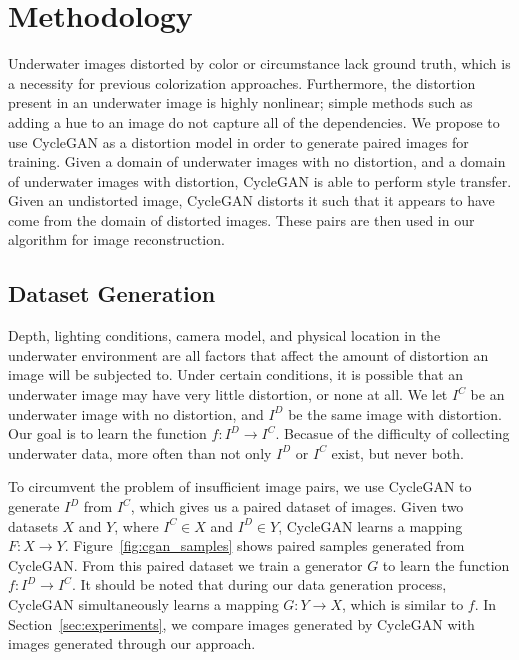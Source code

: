 \section{Methodology}
\label{sec:methodology}
Underwater images distorted by color or circumstance lack ground truth, which is a necessity for previous colorization
approaches. Furthermore, the distortion present in an underwater image is highly nonlinear; simple methods such as
adding a hue to an image do not capture all of the dependencies. We propose to use CycleGAN as a distortion model in
order to generate paired images for training. Given a domain of underwater images with no distortion, and a domain of
underwater images with distortion, CycleGAN is able to perform style transfer. Given an undistorted image, CycleGAN
distorts it such that it appears to have come from the domain of distorted images. These pairs are then used in our
algorithm for image reconstruction.

\subsection{Dataset Generation}
Depth, lighting conditions, camera model, and physical location in the underwater environment are all factors that affect the 
amount of distortion an image will be subjected to. Under certain conditions, it is possible that an underwater image may have 
very little distortion, or none at all. We let 
$I^C$ be an underwater image with no distortion, and $I^D$ be the same image with distortion. Our goal is to learn the function 
$f: I^D \rightarrow I^C$. Becasue of the difficulty of collecting underwater data, more often than not only $I^D$ or $I^C$ exist, 
but never both.

To circumvent the problem of insufficient image pairs, we use CycleGAN to generate $I^D$ from $I^C$, which gives us a 
paired dataset of images. Given two datasets $X$ and $Y$, where $I^C \in X$ and $I^D \in Y$, CycleGAN learns a mapping $F: X 
\rightarrow Y$. Figure~\ref{fig:cgan_samples} shows paired samples generated from CycleGAN. From this paired dataset we train a 
generator $G$ to learn the function $f: I^D \rightarrow I^C$. It should be noted that during our data generation process, CycleGAN 
simultaneously learns a mapping $G: Y \rightarrow X$, which is similar to $f$. In Section~\ref{sec:experiments}, we compare images 
generated by CycleGAN with images generated through our approach.

